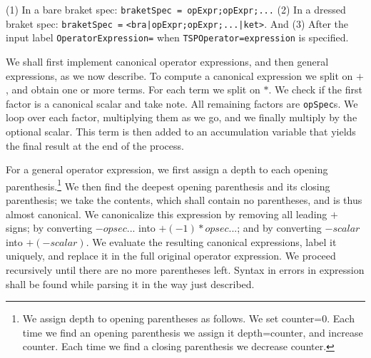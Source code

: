 \documentclass{article}
\begin{document}
(1) In a bare braket spec:
 \texttt{braketSpec = opExpr;opExpr;...}
(2) In a dressed braket spec:
 \texttt{braketSpec =} \texttt{<bra|opExpr;opExpr;...|ket>}.
And (3) After the input label \texttt{OperatorExpression=} when
 \texttt{TSPOperator=expression} is specified.

We shall first implement canonical operator expressions, and then general expressions,
as we now describe.
To compute a canonical expression we split on $+$, and obtain one or more terms.
For each term we split on $*$. We check if the first factor is a 
canonical scalar and take note. All remaining factors are \texttt{opSpec}s.
We loop over each factor, multiplying them as we go, and
we finally multiply by the optional scalar. This term is then added to an
accumulation variable that yields the final result at the end of the process.

For a general operator expression, we first assign a depth to each
opening parenthesis.\footnote{We assign depth to opening parentheses as follows. 
We set counter=0. Each
time we find an opening parenthesis we assign it depth=counter, and increase counter.
Each time we find a closing parenthesis we decrease counter.}
We then find the deepest opening parenthesis and its closing parenthesis;
we take the contents, which shall contain no parentheses, and is thus
almost canonical. We canonicalize this expression by removing all leading $+$ signs;
by converting $-opsec...$ into $+(-1)*opsec...$; and 
by converting $-scalar$ into $+(-scalar)$. We evaluate the resulting
canonical expressions, label it uniquely, and replace it in
the full original operator expression. We proceed recursively until
there are no more parentheses left.
Syntax in errors in expression shall be found while parsing it in the way
just described.
\end{document}
